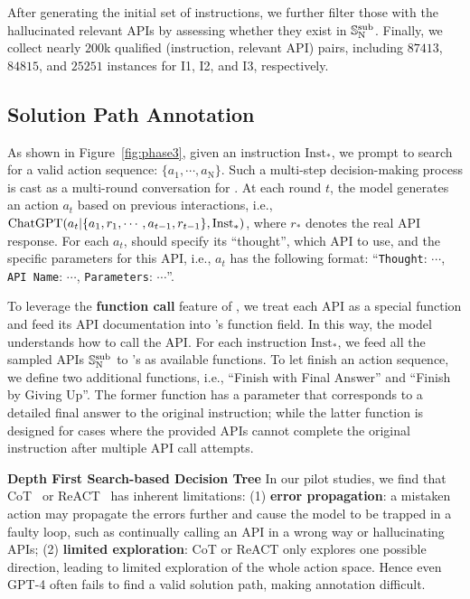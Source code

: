 After generating the initial set of instructions, we further filter those with the hallucinated relevant APIs by assessing whether they exist in ${\mathbb{S}}_\text{N}^{\text{sub}}$.
Finally, we collect nearly $200$k qualified (instruction, relevant API) pairs, including $87413$, $84815$, and $25251$ instances for I1, I2, and I3, respectively.

\subsection{Solution Path Annotation}
\label{sec:answer_annotation}
As shown in Figure~\ref{fig:phase3}, given an instruction $\text{Inst}_*$, we prompt \turbo to search for a valid action sequence: $\{a_1, \cdots, a_\text{N}\}$. Such a multi-step decision-making process is cast as a multi-round conversation for \turbo. At each round $t$, the model generates an action $a_t$ based on previous interactions, i.e., $\text{ChatGPT}(a_t|\{a_1, r_1, \cdots, a_{t-1}, r_{t-1}\}, \text{Inst}_*)$, where $r_*$ denotes the real API response.
For each $a_t$, \turbo should specify its ``thought'',  which API to use, and the specific parameters for this API, i.e., $a_t$ has the following format: ``\texttt{Thought}: $\cdots$, \texttt{API Name}: $\cdots$, \texttt{Parameters}: $\cdots$''.

To leverage the \textbf{function call} feature of \turbo, we treat each API as a special function and feed its API documentation into \turbo's function field. In this way, the model understands how to call the API. For each instruction $\text{Inst}_*$, we feed all the sampled APIs ${\mathbb{S}}_\text{N}^{\text{sub}}$ to \turbo's as available functions.
To let \turbo finish an action sequence, we define two additional functions, i.e., ``Finish with Final Answer'' and ``Finish by Giving Up''. The former function has a parameter that corresponds to a detailed final answer to the original instruction; while the latter function is designed for cases where the provided APIs cannot complete the original instruction after multiple API call attempts.

\textbf{Depth First Search-based Decision Tree} \quad
In our pilot studies, we find that CoT~\citep{wei2023chainofthought} or ReACT~\citep{yao2022react} has inherent limitations: (1) \textbf{error propagation}: a mistaken action may propagate the errors further and cause the model to be trapped in a faulty loop, such as continually calling an API in a wrong way or hallucinating APIs; (2) \textbf{limited exploration}: CoT or ReACT only explores one possible direction, leading to limited exploration of the whole action space. Hence even GPT-4 often fails to find a valid solution path, making annotation difficult.


